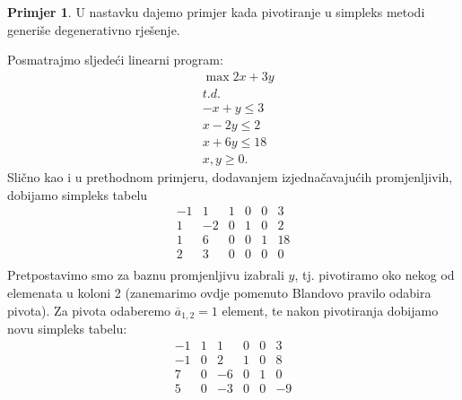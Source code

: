 \documentclass[a4paper, utf8, 11pt, colorlinks]{book}
\theoremstyle{definition}
\newtheorem{primjer}{Primjer}[chapter]
\begin{document}
\begin{primjer} U nastavku dajemo primjer kada pivotiranje u simpleks metodi generiše degenerativno rješenje. 
\end{primjer}
Posmatrajmo sljedeći linearni program:
\begin{align*}
    &\max 2x + 3y \\
    &  {t.d.} \\
	& -x + y \leq 3 \\
	& x - 2y \leq 2 \\
	& x + 6y \leq 18 \\
	& x,y \geq 0. 
\end{align*}
Slično kao i u prethodnom primjeru, dodavanjem izjednačavajućih promjenljivih, dobijamo simpleks 
tabelu 
$$\begin{array}{ccccc|c}
     -1 & 1 & 1 & 0 & 0 & 3 \\
      1 &-2 & 0 & 1 & 0 & 2 \\
      1 & 6 & 0 & 0 & 1 & 18 \\ \hline
      2 & 3 & 0 & 0 & 0 & 0 \\
\end{array}$$
Pretpostavimo smo  za baznu promjenljivu izabrali $y$, tj. pivotiramo oko nekog od elemenata u koloni 2 (zanemarimo ovdje pomenuto Blandovo pravilo odabira pivota). Za pivota odaberemo $\overline{a}_{1,2}=1$ element, te nakon pivotiranja dobijamo novu simpleks tabelu:
$$\begin{array}{ccccc|c}
	-1 & 1 & 1 & 0 & 0 & 3 \\
    -1 & 0 & 2 & 1 & 0 & 8 \\
    7 & 0 & -6 & 0 & 1 & 0 \\ \hline
    5 & 0 & -3 & 0 & 0 & -9 \\
\end{array}$$
 
\end{document}
